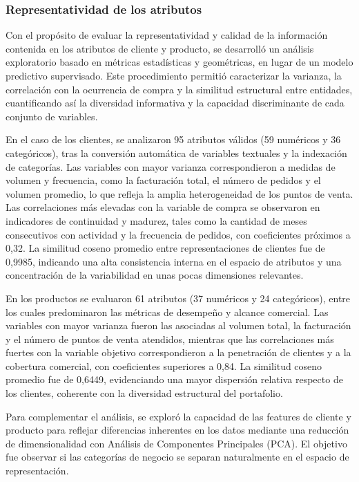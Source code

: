 \subsubsection{Representatividad de los atributos}

Con el propósito de evaluar la representatividad y calidad de la información contenida en los atributos de cliente y producto, se desarrolló un análisis exploratorio basado en métricas estadísticas y geométricas, en lugar de un modelo predictivo supervisado. Este procedimiento permitió caracterizar la varianza, la correlación con la ocurrencia de compra y la similitud estructural entre entidades, cuantificando así la diversidad informativa y la capacidad discriminante de cada conjunto de variables.

En el caso de los clientes, se analizaron 95 atributos válidos (59 numéricos y 36 categóricos), tras la conversión automática de variables textuales y la indexación de categorías. Las variables con mayor varianza correspondieron a medidas de volumen y frecuencia, como la facturación total, el número de pedidos y el volumen promedio, lo que refleja la amplia heterogeneidad de los puntos de venta. Las correlaciones más elevadas con la variable de compra se observaron en indicadores de continuidad y madurez, tales como la cantidad de meses consecutivos con actividad y la frecuencia de pedidos, con coeficientes próximos a 0{,}32. La similitud coseno promedio entre representaciones de clientes fue de 0{,}9985, indicando una alta consistencia interna en el espacio de atributos y una concentración de la variabilidad en unas pocas dimensiones relevantes.

En los productos se evaluaron 61 atributos (37 numéricos y 24 categóricos), entre los cuales predominaron las métricas de desempeño y alcance comercial. Las variables con mayor varianza fueron las asociadas al volumen total, la facturación y el número de puntos de venta atendidos, mientras que las correlaciones más fuertes con la variable objetivo correspondieron a la penetración de clientes y a la cobertura comercial, con coeficientes superiores a 0{,}84. La similitud coseno promedio fue de 0{,}6449, evidenciando una mayor dispersión relativa respecto de los clientes, coherente con la diversidad estructural del portafolio.

Para complementar el análisis, se exploró la capacidad de las features de cliente y producto para reflejar diferencias inherentes en los datos mediante una reducción de dimensionalidad con Análisis de Componentes Principales (PCA). El objetivo fue observar si las categorías de negocio se separan naturalmente en el espacio de representación. 

